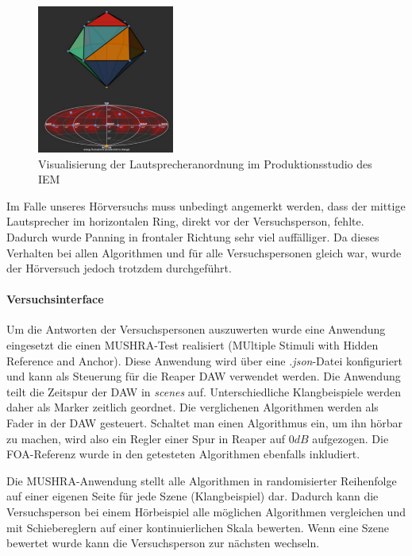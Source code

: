 \begin{figure}[!ht]
  \centering
  \includegraphics[width=0.4\textwidth]{aufbau/plots/speaker_pos_prod_studio.png}
  \caption{Visualisierung der Lautsprecheranordnung im Produktionsstudio des IEM \protect\footnotemark}
  \label{fig:aufb:prodstud}
\end{figure}


Im Falle unseres Hörversuchs muss unbedingt angemerkt werden, dass der mittige Lautsprecher im horizontalen Ring, direkt vor der Versuchsperson, fehlte. Dadurch wurde Panning in frontaler Richtung sehr viel auffälliger. Da dieses Verhalten bei allen Algorithmen und für alle Versuchspersonen gleich war, wurde der Hörversuch jedoch trotzdem durchgeführt.

\paragraph{Versuchsinterface}
Um die Antworten der Versuchspersonen auszuwerten wurde eine Anwendung eingesetzt die einen MUSHRA-Test realisiert (MUltiple Stimuli with Hidden Reference and Anchor). Diese Anwendung wird über eine \textit{.json}-Datei konfiguriert und kann als Steuerung für die Reaper DAW verwendet werden. Die Anwendung teilt die Zeitspur der DAW in \textit{scenes} auf. Unterschiedliche Klangbeispiele werden daher als Marker zeitlich geordnet. Die verglichenen Algorithmen werden als Fader in der DAW gesteuert. Schaltet man einen Algorithmus ein, um ihn hörbar zu machen, wird also ein Regler einer Spur in Reaper auf $0dB$ aufgezogen. Die FOA-Referenz wurde in den getesteten Algorithmen ebenfalls inkludiert.

Die MUSHRA-Anwendung stellt alle Algorithmen in randomisierter Reihenfolge auf einer eigenen Seite für jede Szene (Klangbeispiel) dar. Dadurch kann die Versuchsperson bei einem Hörbeispiel alle möglichen Algorithmen vergleichen und mit Schiebereglern auf einer kontinuierlichen Skala bewerten. Wenn eine Szene bewertet wurde kann die Versuchsperson zur nächsten wechseln.